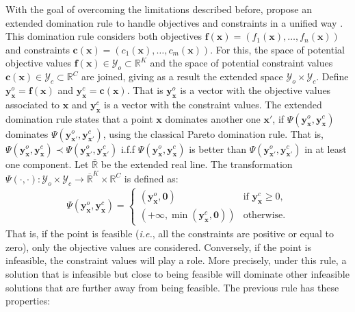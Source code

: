 With the goal of overcoming the limitations described before, propose an extended domination rule to handle objectives and constraints in a unified way \cite{feliot2015bayesian}.
This domination rule considers both objectives $\mathbf{f}(\mathbf{x}) = (f_1(\mathbf{x}),\ldots,f_n(\mathbf{x}))$ and
constraints $\mathbf{c}(\mathbf{x}) = (c_1(\mathbf{x}),\ldots,c_m(\mathbf{x}))$.
For this, the space of potential objective values $\mathbf{f}(\mathbf{x}) \in \mathcal{Y}_o\subset \mathds{R}^K$ and the space of
potential constraint values $\mathbf{c}(\mathbf{x}) \in \mathcal{Y}_c \subset \mathds{R}^C$ are joined, giving as a result
the extended space $\mathcal{Y}_o \times \mathcal{Y}_c$.
Define $\mathbf{y}_\mathbf{x}^o=\mathbf{f}(\mathbf{x})$ and
$\mathbf{y}_\mathbf{x}^c=\mathbf{c}(\mathbf{x})$. That is $\mathbf{y}^o_\mathbf{x}$ is a vector with the objective values associated to
$\mathbf{x}$ and $\mathbf{y}^c_\mathbf{x}$ is a vector with the constraint values.
The extended domination rule states that a point $\mathbf{x}$ dominates another one $\mathbf{x}'$,
if $\Psi(\mathbf{y}_\mathbf{x}^o,\mathbf{y}_\mathbf{x}^c)$ dominates $\Psi(\mathbf{y}^o_{\mathbf{x}'}, 
\mathbf{y}^c_{\mathbf{x}'})$, using the classical
Pareto domination rule. That is, $\Psi(\mathbf{y}_\mathbf{x}^o, \mathbf{y}_\mathbf{x}^c) 
\prec \Psi(\mathbf{y}^o_{\mathbf{x}'}, \mathbf{y}^c_{\mathbf{x}'})$
i.f.f $\Psi(\mathbf{y}_\mathbf{x}^o,\mathbf{y}_\mathbf{x}^c)$ is better than $\Psi(\mathbf{y}^o_{\mathbf{x}'}, 
\mathbf{y}^c_{\mathbf{x}'})$ in at least one component.
Let $\overline{\mathds{R}}$ be the extended real line.
The transformation $\Psi(\cdot, \cdot): \mathcal{Y}_o \times \mathcal{Y}_c \rightarrow \overline{\mathds{R}}^K\times \mathds{R}^C$
is defined as:
\begin{align}
\Psi(\mathbf{y}^o_\mathbf{x},\mathbf{y}^c_\mathbf{x}) = \left\{ \begin{array}{ll}
(\mathbf{y}^o_\mathbf{x},\mathbf{0}) & \mbox{if $\mathbf{y}^c_\mathbf{x} \geq 0$},\\
(+\infty, \min{(\mathbf{y}^c_\mathbf{x},\mathbf{0})}) & \mbox{otherwise.}
\end{array}
\right.
\end{align}
That is, if the point is feasible (\emph{i.e.}, all the constraints are positive or equal to zero), only the objective
values are considered. Conversely, if the point is infeasible, the constraint values will play a role.
More precisely, under this rule, a solution that is infeasible but close to being feasible will dominate
other infeasible solutions that are further away from being feasible. The previous rule has these properties:
